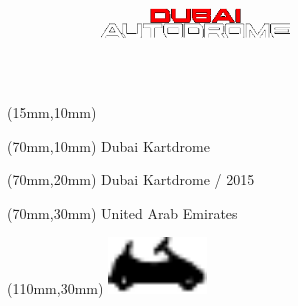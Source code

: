 \null\newpage
\begin{textblock*}{50mm}(15mm,10mm)%
\includegraphics[width=50mm]{LG/DUB.png}
\end{textblock*}
\begin{textblock*}{130mm}(70mm,10mm)%
{\fontsize{20}{20}\selectfont Dubai Kartdrome}\\
\end{textblock*}
\begin{textblock*}{120mm}(70mm,20mm)%
{\fontsize{16}{16}\selectfont Dubai Kartdrome / 2015}\\
\end{textblock*}
\begin{textblock*}{120mm}(70mm,30mm)%
{\fontsize{12}{12}\selectfont United Arab Emirates}
\end{textblock*}
\begin{textblock*}{30mm}(110mm,30mm)%
\centering
\includegraphics[height=15mm]{icons/kart.pdf}
\end{textblock*}
